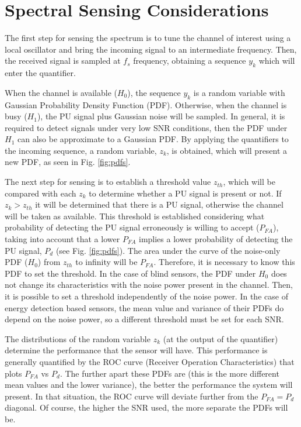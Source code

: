 \documentclass[lettersize,journal]{IEEEtran}
\begin{document}
\section{Spectral Sensing Considerations}
The first step for sensing the spectrum is to tune the channel of interest using a local oscillator and bring the incoming signal to an intermediate frequency. Then, the received signal is sampled at $f_s$ frequency, obtaining a sequence $y_k$ which will enter the quantifier.

When the channel is available ($H_0$), the sequence $y_k$ is a random variable with Gaussian Probability Density Function (PDF). Otherwise, when the channel is busy ($H_1$), the PU signal plus Gaussian noise will be sampled. In general, it is required to detect signals under very low SNR conditions, then the PDF under $H_1$ can also be approximate to  a Gaussian PDF. By applying the quantifiers to the incoming sequence, a random variable, $z_k$, is obtained, which will present a new PDF, as seen in Fig. \ref{fig:pdfs}. 

The next step for sensing is to establish a threshold value $z_{th}$, which will be compared with each $z_k$ to determine whether a PU signal is present or not. If $z_k>z_{th}$ it will be determined that there is a PU signal, otherwise the channel will be taken as available. This threshold is established considering what probability of detecting the PU signal erroneously is willing to accept ($P_{FA}$), taking into account that a lower $P_{FA}$  implies a lower probability of detecting the PU signal, $P_d$ (see Fig. \ref{fig:pdfs}). The area under the curve of the noise-only PDF ($H_0$) from $z_{th}$ to infinity will be $P_{FA}$. Therefore,  it is necessary to know this PDF to set the threshold. In the case of blind sensors, the PDF under $H_0$ does not change its characteristics with the noise power present in the channel. Then, it is possible to set a threshold independently of the noise power. In the case of energy detection based sensors, the mean value and variance of their PDFs do depend on the noise power, so a different threshold must be set for each SNR.

The distributions of the random variable $z_k$ (at the output of the quantifier) determine the performance that the sensor will have. This performance is generally quantified by the ROC curve (Receiver Operation Characteristics) \cite{Brown2005} that plots $P_{FA}$ vs $P_{d}$. The further apart these PDFs are (this is the more different mean values and the lower variance), the better the performance the system will present. In that situation, the ROC curve will deviate further from the $P_ {FA} = P_ {d}$ diagonal. Of course, the higher the SNR used, the more separate the PDFs will be.
\end{document}
